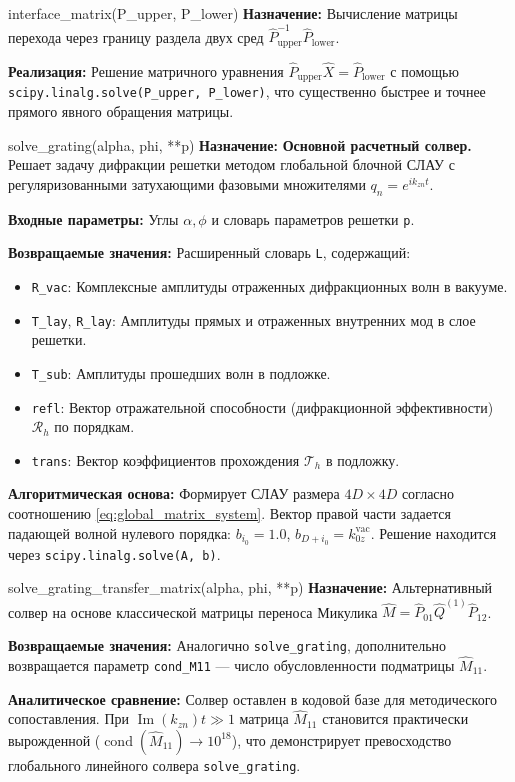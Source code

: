\documentclass[a4paper,11pt]{article}
\begin{document}
\begin{funcbox}{interface\_matrix(P\_upper, P\_lower)}
\textbf{Назначение:} Вычисление матрицы перехода через границу раздела двух сред $\hat{P}_{\text{upper}}^{-1} \hat{P}_{\text{lower}}$.

\textbf{Реализация:} Решение матричного уравнения $\hat{P}_{\text{upper}} \hat{X} = \hat{P}_{\text{lower}}$ с помощью \texttt{scipy.linalg.solve(P\_upper, P\_lower)}, что существенно быстрее и точнее прямого явного обращения матрицы.
\end{funcbox}

\begin{funcbox}{solve\_grating(alpha, phi, **p)}
\textbf{Назначение:} \textbf{Основной расчетный солвер.} Решает задачу дифракции решетки методом глобальной блочной СЛАУ с регуляризованными затухающими фазовыми множителями $q_n = e^{i k_{zn} t}$.

\textbf{Входные параметры:} Углы $\alpha, \phi$ и словарь параметров решетки \texttt{p}.

\textbf{Возвращаемые значения:} Расширенный словарь \texttt{L}, содержащий:
\begin{itemize}
    \item \texttt{R\_vac}: Комплексные амплитуды отраженных дифракционных волн в вакууме.
    \item \texttt{T\_lay}, \texttt{R\_lay}: Амплитуды прямых и отраженных внутренних мод в слое решетки.
    \item \texttt{T\_sub}: Амплитуды прошедших волн в подложке.
    \item \texttt{refl}: Вектор отражательной способности (дифракционной эффективности) $\mathcal{R}_h$ по порядкам.
    \item \texttt{trans}: Вектор коэффициентов прохождения $\mathcal{T}_h$ в подложку.
\end{itemize}

\textbf{Алгоритмическая основа:}
Формирует СЛАУ размера $4D \times 4D$ согласно соотношению \eqref{eq:global_matrix_system}. Вектор правой части задается падающей волной нулевого порядка: $b_{i_0} = 1.0$, $b_{D+i_0} = k_{0z}^{\text{vac}}$. Решение находится через \texttt{scipy.linalg.solve(A, b)}.
\end{funcbox}

\begin{funcbox}{solve\_grating\_transfer\_matrix(alpha, phi, **p)}
\textbf{Назначение:} Альтернативный солвер на основе классической матрицы переноса Микулика $\hat{M} = \hat{P}_{01} \hat{Q}^{(1)} \hat{P}_{12}$.

\textbf{Возвращаемые значения:} Аналогично \texttt{solve\_grating}, дополнительно возвращается параметр \texttt{cond\_M11} --- число обусловленности подматрицы $\hat{M}_{11}$.

\textbf{Аналитическое сравнение:} Солвер оставлен в кодовой базе для методического сопоставления. При $\operatorname{Im}(k_{zn})t \gg 1$ матрица $\hat{M}_{11}$ становится практически вырожденной ($\operatorname{cond}(\hat{M}_{11}) \to 10^{18}$), что демонстрирует превосходство глобального линейного солвера \texttt{solve\_grating}.
\end{funcbox}
\end{document}
